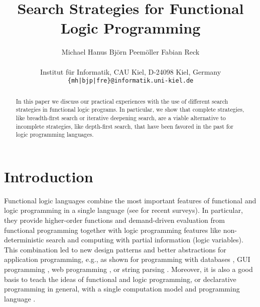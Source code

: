 \documentclass[english]{lni}
\author{
Michael Hanus
\quad
Bj{\"o}rn Peem{\"o}ller
\quad
Fabian Reck \\
\\
Institut f\"ur Informatik, CAU Kiel, D-24098 Kiel, Germany \\
\texttt{\{mh|bjp|fre\}@informatik.uni-kiel.de}
}
\title{Search Strategies for Functional Logic Programming}
\begin{document}
\pagestyle{plain} %
\maketitle

\begin{abstract}
In this paper we discuss our practical experiences
with the use of different search strategies
in functional logic programs.
In particular, we show that complete strategies,
like breadth-first search or iterative deepening search,
are a viable alternative to incomplete strategies, like depth-first
search, that have been favored in the past for logic programming languages.
\end{abstract}

\section{Introduction}

Functional logic languages combine the most important
features of functional and logic programming in a single language
(see \cite{AntoyHanus10CACM,Hanus07ICLP} for recent surveys).
In particular, they provide higher-order functions and demand-driven
evaluation from functional programming together with logic programming features
like non-deterministic search and computing with partial information
(logic variables).
This combination
led to new design patterns \cite{AntoyHanus02FLOPS,AntoyHanus11WFLP}
and better abstractions for application programming,
e.g., as shown for programming with databases
\cite{BrasselHanusMueller08PADL,Fischer05},
GUI programming \cite{Hanus00PADL},
web programming \cite{Hanus01PADL,Hanus06PPDP,HanusKoschnicke10PADL},
or string parsing \cite{CaballeroLopez99}.
Moreover, it is also a good basis
to teach the ideas of functional and logic programming,
or declarative programming in general,
with a single computation model and programming language
\cite{Hanus97DPLE}.
\end{document}
